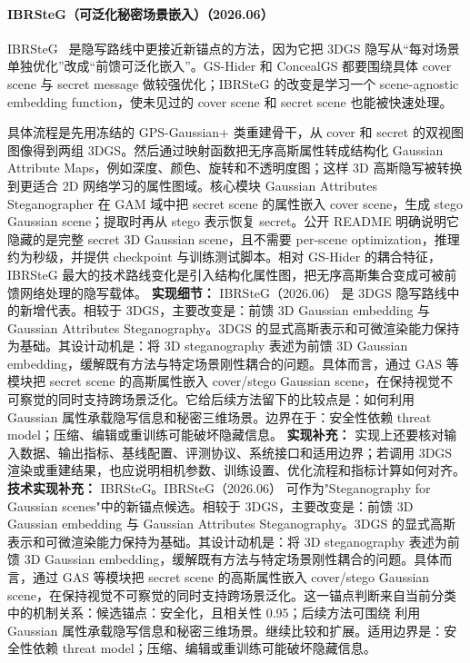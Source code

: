 \paragraph{IBRSteG（可泛化秘密场景嵌入）（2026.06）}
IBRSteG~\cite{2606_30024} 是隐写路线中更接近新锚点的方法，因为它把 3DGS 隐写从“每对场景单独优化”改成“前馈可泛化嵌入”。GS-Hider 和 ConcealGS 都要围绕具体 cover scene 与 secret message 做较强优化；IBRSteG 的改变是学习一个 scene-agnostic embedding function，使未见过的 cover scene 和 secret scene 也能被快速处理。

具体流程是先用冻结的 GPS-Gaussian+ 类重建骨干，从 cover 和 secret 的双视图图像得到两组 3DGS。然后通过映射函数把无序高斯属性转成结构化 Gaussian Attribute Maps，例如深度、颜色、旋转和不透明度图；这样 3D 高斯隐写被转换到更适合 2D 网络学习的属性图域。核心模块 Gaussian Attributes Steganographer 在 GAM 域中把 secret scene 的属性嵌入 cover scene，生成 stego Gaussian scene；提取时再从 stego 表示恢复 secret。公开 README 明确说明它隐藏的是完整 secret 3D Gaussian scene，且不需要 per-scene optimization，推理约为秒级，并提供 checkpoint 与训练测试脚本。相对 GS-Hider 的耦合特征，IBRSteG 最大的技术路线变化是引入结构化属性图，把无序高斯集合变成可被前馈网络处理的隐写载体。
\textbf{实现细节：} IBRSteG（2026.06） 是 3DGS 隐写路线中的新增代表。相较于 3DGS，主要改变是：前馈 3D Gaussian embedding 与 Gaussian Attributes Steganography。3DGS 的显式高斯表示和可微渲染能力保持为基础。其设计动机是：将 3D steganography 表述为前馈 3D Gaussian embedding，缓解既有方法与特定场景刚性耦合的问题。具体而言，通过 GAS 等模块把 secret scene 的高斯属性嵌入 cover/stego Gaussian scene，在保持视觉不可察觉的同时支持跨场景泛化。它给后续方法留下的比较点是：如何利用 Gaussian 属性承载隐写信息和秘密三维场景。边界在于：安全性依赖 threat model；压缩、编辑或重训练可能破坏隐藏信息。
\textbf{实现补充：} 实现上还要核对输入数据、输出指标、基线配置、评测协议、系统接口和适用边界；若调用 3DGS 渲染或重建结果，也应说明相机参数、训练设置、优化流程和指标计算如何对齐。
\textbf{技术实现补充：} IBRSteG。IBRSteG（2026.06） 可作为"Steganography for Gaussian scenes"中的新锚点候选。相较于 3DGS，主要改变是：前馈 3D Gaussian embedding 与 Gaussian Attributes Steganography。3DGS 的显式高斯表示和可微渲染能力保持为基础。其设计动机是：将 3D steganography 表述为前馈 3D Gaussian embedding，缓解既有方法与特定场景刚性耦合的问题。具体而言，通过 GAS 等模块把 secret scene 的高斯属性嵌入 cover/stego Gaussian scene，在保持视觉不可察觉的同时支持跨场景泛化。这一锚点判断来自当前分类中的机制关系：候选锚点：安全化，且相关性 0.95；后续方法可围绕 利用 Gaussian 属性承载隐写信息和秘密三维场景。继续比较和扩展。适用边界是：安全性依赖 threat model；压缩、编辑或重训练可能破坏隐藏信息。
